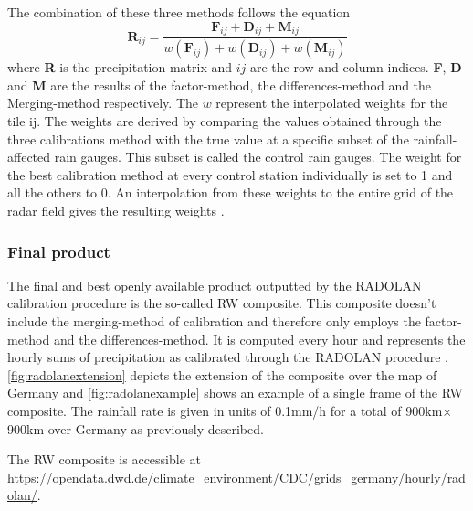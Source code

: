 The combination of these three methods follows the equation 
\begin{equation}
    \textbf{R}_{ij} = \dfrac{\textbf{F}_{ij} + \textbf{D}_{ij} + \textbf{M}_{ij}}{w(\textbf{F}_{ij}) + w(\textbf{D}_{ij}) + w(\textbf{M}_{ij})}
\end{equation}
where \textbf{R} is the precipitation matrix and $ij$ are the row and column indices. \textbf{F}, \textbf{D} and \textbf{M} are the results of the factor-method, the differences-method and the Merging-method respectively. The $w$ represent the interpolated weights for the tile {ij}. The weights are derived by comparing the values obtained through the three calibrations method with the true value at a specific subset of the rainfall-affected rain gauges. This subset is called the control rain gauges. The weight for the best calibration method at every control station individually is set to 1 and all the others to 0. An interpolation from these weights to the entire grid of the radar field gives the resulting weights \citep{Weigl2004ProjektOmbrometer}.
\subsubsection{Final product}
The final and best openly available product outputted by the RADOLAN calibration procedure is the so-called RW composite. This composite doesn't include the merging-method of calibration and therefore only employs the factor-method and the differences-method. It is computed every hour and represents the hourly sums of  precipitation as calibrated through the RADOLAN procedure  \citep{Weigl2021RADOLAN/RADVOR2.5.3}. \cref{fig:radolanextension} depicts the extension of the composite over the map of Germany and \cref{fig:radolanexample} shows an example of a single frame of the RW composite. The rainfall rate is given in units of 0.1mm/h for a total of 900km$\times$900km over Germany as previously described.

The RW composite is accessible at \url{https://opendata.dwd.de/climate_environment/CDC/grids_germany/hourly/radolan/}.

